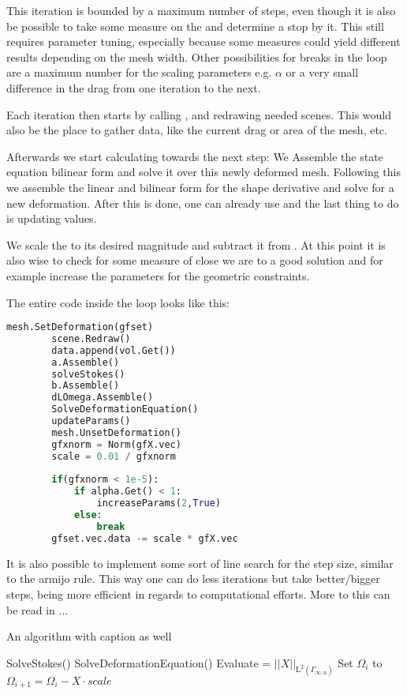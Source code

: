 This iteration is bounded by a maximum number of steps, even though it is also be possible to take some measure on the  and determine a stop by it.
This still requires parameter tuning, especially because some measures could yield different results depending on the mesh width.
Other possibilities for breaks in the loop are a maximum number for the scaling parameters e.g. $\alpha$ or a very small difference in the drag from one iteration to the next.

Each iteration then starts by calling , and redrawing needed scenes. This would also be the place to gather data, like the current drag or area of the mesh, etc.

Afterwards we start calculating towards the next step:
We Assemble the state equation bilinear form and solve it over this newly deformed mesh. Following this we assemble the linear and bilinear form for the shape derivative and solve for a new deformation. After this is done, one can already use  and the last thing to do is updating values.

We scale the  to its desired magnitude and subtract it from . At this point it is also wise to check for some measure of close we are to a good solution and for example increase the parameters for the geometric constraints.

The entire code inside the loop looks like this:

\begin{lstlisting}[language=Python, title=Iteration, label=lst:loop]
		mesh.SetDeformation(gfset)
		scene.Redraw()
		data.append(vol.Get())
		a.Assemble()
		solveStokes()
		b.Assemble()
		dLOmega.Assemble()
		SolveDeformationEquation()
		updateParams()
		mesh.UnsetDeformation()
		gfxnorm = Norm(gfX.vec)
		scale = 0.01 / gfxnorm
		
		if(gfxnorm < 1e-5):
			if alpha.Get() < 1:
				increaseParams(2,True)
			else:
				break
		gfset.vec.data -= scale * gfX.vec
\end{lstlisting}

It is also possible to implement some sort of line search for the step size, similar to the armijo rule. This way one can do less iterations but take better/bigger steps, being more efficient in regards to computational efforts. More to this can be read in ...

\begin{algorithm}
	\caption{An algorithm with caption as well}
	\begin{algorithmic}
	\State {}
	\State {}
		\State SolveStokes() 
		\State SolveDeformationEquation() 
		\State Evaluate  = $ || X ||_{\mathrm{L}^2(\Gamma_{\infty , \mathrm{n}})} $
			\State {}
			\State {}
		\EndIf
		\EndIf
		\State Set $\Omega_i$ to $\Omega_{i+1} = \Omega_i - X \cdot scale$
	\EndFor
	\end{algorithmic}
\end{algorithm}